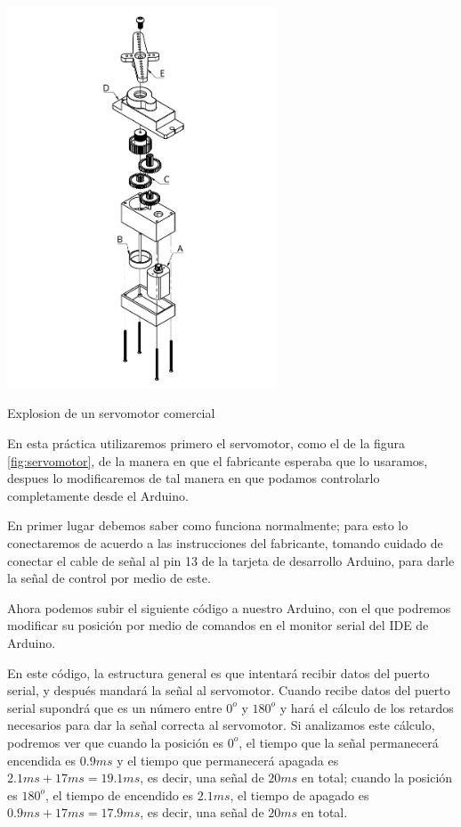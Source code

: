 		\begin{marginfigure}
			\begin{center}
				\includegraphics[width=0.6\textwidth]{images/servo.pdf}
				\caption{Explosion de un servomotor comercial}
				\label{fig:servomotor}
			\end{center}
		\end{marginfigure}

		En esta práctica utilizaremos primero el servomotor, como el de la figura \ref{fig:servomotor}, de la manera en que el fabricante esperaba que lo usaramos, despues lo modificaremos de tal manera en que podamos controlarlo completamente desde el Arduino.

		En primer lugar debemos saber como funciona normalmente; para esto lo conectaremos de acuerdo a las instrucciones del fabricante, tomando cuidado de conectar el cable de señal al pin 13 de la tarjeta de desarrollo Arduino, para darle la señal de control por medio de este.

		Ahora podemos subir el siguiente código a nuestro Arduino, con el que podremos modificar su posición por medio de comandos en el monitor serial del IDE de Arduino.

		\begin{multicols}{2}
			
		\end{multicols}

		En este código, la estructura general es que intentará recibir datos del puerto serial, y después mandará la señal al servomotor. Cuando recibe datos del puerto serial supondrá que es un número entre $0^o$ y $180^o$ y hará el cálculo de los retardos necesarios para dar la señal correcta al servomotor. Si analizamos este cálculo, podremos ver que cuando la posición es $0^o$, el tiempo que la señal permanecerá encendida es $0.9ms$ y el tiempo que permanecerá apagada es $2.1ms + 17ms = 19.1ms$, es decir, una señal de $20ms$ en total; cuando la posición es $180^o$, el tiempo de encendido es $2.1ms$, el tiempo de apagado es $0.9ms + 17ms = 17.9ms$, es decir, una señal de $20ms$ en total.

